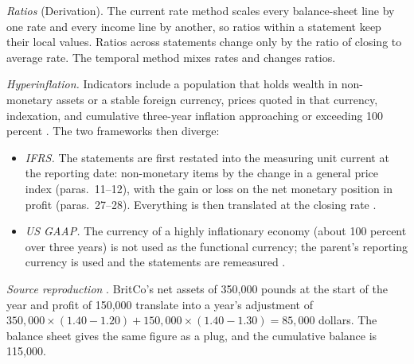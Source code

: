 \begin{qfmethod}
\emph{Ratios} (Derivation). The current rate method scales every balance-sheet line by one rate and every income line by another, so ratios within a statement keep their local values. Ratios across statements change only by the ratio of closing to average rate. The temporal method mixes rates and changes ratios.

\emph{Hyperinflation.} Indicators include a population that holds wealth in non-monetary assets or a stable foreign currency, prices quoted in that currency, indexation, and cumulative three-year inflation approaching or exceeding 100 percent \citep[para.~3]{eu-2023-1803-ias29}. The two frameworks then diverge:
\begin{itemize}
\item \emph{IFRS.} The statements are first restated into the measuring unit current at the reporting date: non-monetary items by the change in a general price index (paras.~11--12), with the gain or loss on the net monetary position in profit (paras.~27--28). Everything is then translated at the closing rate \citep[paras.~42--43]{eu-2023-1803-ias21}.
\item \emph{US GAAP.} The currency of a highly inflationary economy (about 100 percent over three years) is not used as the functional currency; the parent's reporting currency is used and the statements are remeasured \citep[para.~11]{us-foreign-currency-1981}.
\end{itemize}

 \emph{Source reproduction} \citep[pp.~304--306]{financial-statement-analysis-2009}. BritCo's net assets of 350,000 pounds at the start of the year and profit of 150,000 translate into a year's adjustment of $350{,}000\times(1.40-1.20)+150{,}000\times(1.40-1.30)=85{,}000$ dollars. The balance sheet gives the same figure as a plug, and the cumulative balance is 115,000.


\end{qfmethod}
